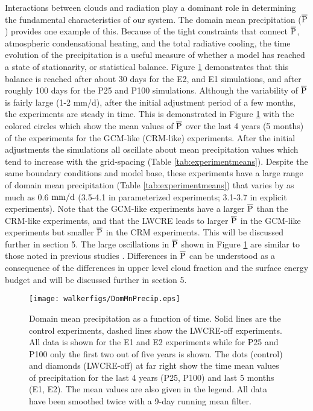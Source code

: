 \documentclass[draft]{agujournal2019}
\begin{document}
Interactions between clouds and radiation play a dominant role in determining the fundamental  
characteristics of our system.  The domain mean precipitation ($\overline{\rm{P}}$) provides one example of this.  
Because of the tight constraints that connect $\overline{\rm{P}}$, atmospheric condensational heating, and 
the total radiative cooling, the time evolution of the precipitation is a useful measure of whether a model has 
reached a state of stationarity, or statistical balance.  Figure \ref{fig:precip_dom_mn} demonstrates that this balance is reached after about 30 
days for the E2, and E1 simulations, and after roughly 100 days for the P25 and P100 simulations.  Although the variability
of  $\overline{\rm{P}}$ is fairly large (1-2 mm/d), after the initial adjustment period of a few months, the experiments are steady in time.  This
is demonstrated in Figure \ref{fig:precip_dom_mn} with the colored circles which show the mean values of $\overline{\rm{P}}$ over the last 4 years (5 months) of the experiments for the GCM-like (CRM-like) experiments.   
After the initial adjustments
the simulations all oscillate about mean precipitation values which tend to increase with the grid-spacing (Table \ref{tab:experimentmeans}).   
Despite the same boundary conditions and model base, these experiments have a large range of domain mean precipitation 
(Table \ref{tab:experimentmeans}) that varies by as much as 0.6 $\rm{mm/d}$ (3.5-4.1 in parameterized experiments; 3.1-3.7 in explicit experiments).  
Note that the GCM-like experiments have a larger $\rm{\overline{P}}$ than the CRM-like experiments, and that the
LWCRE leads to larger $\rm{\overline{P}}$ in the GCM-like experiments but smaller $\rm{\overline{P}}$ in the CRM experiments.  
This will be discussed further in section 5. 
The large oscillations in $\overline{\rm{P}}$ shown in Figure \ref{fig:precip_dom_mn} are similar to those noted in previous studies 
\cite{Silvers_etal_2016, Patrizio_Randall_2019}.
Differences in $\rm{\overline{P}}$ can be understood as a consequence of the differences in upper level cloud fraction 
and the surface energy budget and will be discussed further in section 5.   

\begin{figure}
  \centering
      \texttt{[image: walkerfigs/DomMnPrecip.eps]}
  \caption{Domain mean precipitation as a function of time.
  Solid lines are the control experiments, dashed lines show the LWCRE-off experiments.  All data is shown for the E1 and E2 experiments
  while for P25 and P100 only the first two out of five years is shown.  The dots (control) and diamonds (LWCRE-off) at far right show the time 
  mean values of precipitation for the 
  last 4 years (P25, P100) and last 5 months (E1, E2).  The mean values are also given in the legend. 
  All data have been smoothed twice with a 9-day running mean filter.  }
    \label{fig:precip_dom_mn}
\end{figure}
\end{document}
